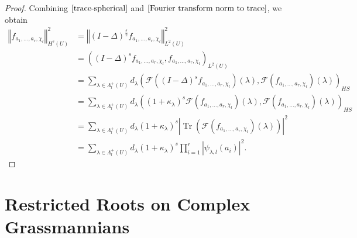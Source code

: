 \documentclass[11pt,a4paper]{amsart}
\DeclareMathOperator{\Tr}{Tr}
\theoremstyle{definition}
\numberwithin{equation}{section}
\begin{document}
\begin{proof}
Combining $\eqref{trace-spherical}$ and  $\eqref{Fourier transform norm to trace}$,   we obtain
\begin{align}
\left\Vert  f_{a_{1},...,a_{r},\chi_l}\right\Vert _{H^{s}\left( U\right) }^2 & = \left\Vert (I-\Delta) ^{\frac{s}{2}}  f_{a_{1},...,a_{r},\chi_l}   \right\Vert^2_{L^2(U)} \nonumber \\
&= \left( (I-\Delta) ^{s}  f_{a_{1},...,a_{r},\chi_l} ,  f_{a_{1},...,a_{r},\chi_l} \right)_{L^2(U)}\nonumber \\ 
&= \sum _{\lambda\in \Lambda_l^+\left(U \right)} d_\lambda \left( \mathcal{F}\left((I-\Delta) ^{s}  f_{a_{1},...,a_{r},\chi_l}\right) (\lambda), \mathcal{F} ( f_{a_{1},...,a_{r},\chi_l})(\lambda) \right)_{HS}\nonumber \\
&= \sum _{\lambda\in \Lambda_l^+\left(U \right)} d_\lambda \left((1+\kappa_{\lambda})^{s} \mathcal{F}\left(  f_{a_{1},...,a_{r},\chi_l}\right)(\lambda) , \mathcal{F} ( f_{a_{1},...,a_{r},\chi_l})(\lambda) \right)_{HS} \nonumber\\
&= \sum _{\lambda\in \Lambda_l^+\left(U \right)} d_\lambda (1+\kappa_{\lambda})^{s}  \left\vert\Tr\left(\mathcal{F}\left(  f_{a_{1},...,a_{r},\chi_l}\right)(\lambda)\right) \right\vert^2 \nonumber\\
&= \sum _{\lambda\in \Lambda_l^+\left(U \right)} d_\lambda (1+\kappa_{\lambda})^{s}\prod_{i=1}^r \left\vert\psi _{\lambda,l}(a_i)\right\vert^2. 
\label{trace 3} \nonumber 
\end{align}

\end{proof}












 







\section{Restricted Roots on Complex Grassmannians}\label{Complex Grassmannians}
\end{document}
